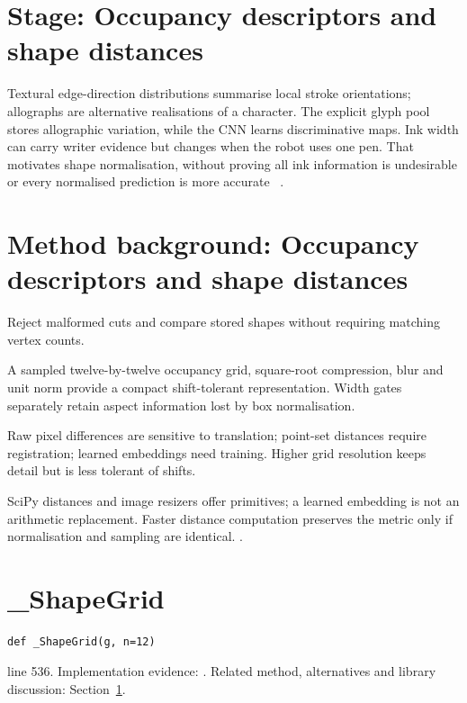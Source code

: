 \section*{Stage: Occupancy descriptors and shape distances}
Textural edge-direction distributions summarise local stroke orientations;
allographs are alternative realisations of a character. The explicit glyph
pool stores allographic variation, while the CNN learns discriminative maps.
Ink width can carry writer evidence but changes when the robot uses one pen.
That motivates shape normalisation, without proving all ink information is
undesirable or every normalised prediction is more accurate
~\cite{bulacu2007,brink2012}.


\section{Method background: Occupancy descriptors and shape distances}\label{method:descriptor}
Reject malformed cuts and compare stored shapes without requiring matching vertex counts.


A sampled twelve-by-twelve occupancy grid, square-root compression, blur and unit norm provide a compact shift-tolerant representation. Width gates separately retain aspect information lost by box normalisation.


Raw pixel differences are sensitive to translation; point-set distances require registration; learned embeddings need training. Higher grid resolution keeps detail but is less tolerant of shifts.


SciPy distances and image resizers offer primitives; a learned embedding is not an arithmetic replacement. Faster distance computation preserves the metric only if normalisation and sampling are identical. \cite{code2026,bulacu2007}.


\section{\_ShapeGrid}\label{fn:style:-ShapeGrid}
\begin{lstlisting}[style=sig]
def _ShapeGrid(g, n=12)
\end{lstlisting}
 line 536. Implementation evidence: \cite{code2026}. Related method, alternatives and library discussion: Section~\ref{method:descriptor}.


